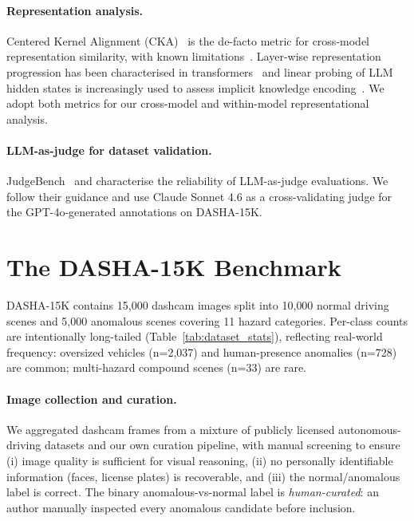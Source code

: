 \documentclass{article}
\newcommand{\bench}{\textsc{DASHA-15K}\xspace}
\begin{document}
\paragraph{Representation analysis.}
Centered Kernel Alignment (CKA)~\citep{cka_kornblith} is the de-facto
metric for cross-model representation similarity, with known
limitations~\citep{cka_reliability}. Layer-wise representation
progression has been characterised in transformers~\citep{layerwise_sim}
and linear probing of LLM hidden states is increasingly used to assess
implicit knowledge encoding~\citep{linear_probe_neurips}. We adopt
both metrics for our cross-model and within-model representational
analysis.

\paragraph{LLM-as-judge for dataset validation.}
JudgeBench~\citep{judgebench} and \citet{llm_judge_survey}
characterise the reliability of LLM-as-judge evaluations. We follow
their guidance and use Claude Sonnet 4.6 as a cross-validating judge
for the GPT-4o-generated annotations on \bench.

\section{The \bench Benchmark}
\label{sec:dataset}



\bench contains 15{,}000 dashcam images split into 10{,}000 normal
driving scenes and 5{,}000 anomalous scenes covering 11 hazard
categories. Per-class counts are intentionally long-tailed
(Table~\ref{tab:dataset_stats}), reflecting real-world frequency:
oversized vehicles (n=2{,}037) and human-presence anomalies (n=728)
are common; multi-hazard compound scenes (n=33) are rare.

\paragraph{Image collection and curation.}
We aggregated dashcam frames from a mixture of publicly licensed
autonomous-driving datasets and our own curation pipeline, with
manual screening to ensure (i) image quality is sufficient for visual
reasoning, (ii) no personally identifiable information (faces, license
plates) is recoverable, and (iii) the
normal/anomalous label is correct. The binary anomalous-vs-normal
label is \emph{human-curated}: an author manually inspected every
anomalous candidate before inclusion.
\end{document}
